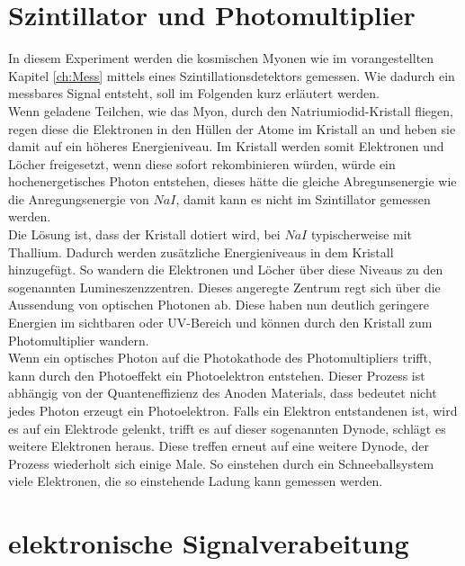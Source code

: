 \documentclass[12pt,a4paper,ngerman]{report}
\begin{document}
	\section{Szintillator und Photomultiplier}
	In diesem Experiment werden die kosmischen Myonen wie im vorangestellten Kapitel \ref{ch:Mess} mittels eines Szintillationsdetektors gemessen. Wie dadurch ein messbares Signal entsteht, soll im Folgenden kurz erläutert werden.\\
	Wenn geladene Teilchen, wie das Myon, durch den Natriumiodid-Kristall fliegen, regen diese die Elektronen in den Hüllen der Atome im Kristall an und heben sie damit auf ein höheres Energieniveau. Im Kristall werden somit Elektronen und Löcher freigesetzt, wenn diese sofort rekombinieren würden, würde ein hochenergetisches Photon entstehen, dieses hätte die gleiche Abregunsenergie wie die Anregungsenergie von $NaI$, damit kann es nicht im Szintillator gemessen werden.\\
	Die Lösung ist, dass der Kristall dotiert wird, bei $NaI$ typischerweise mit Thallium. Dadurch werden zusätzliche Energieniveaus in dem Kristall hinzugefügt. So wandern die Elektronen und Löcher über diese Niveaus zu den sogenannten Lumineszenzzentren. Dieses angeregte Zentrum regt sich über die Aussendung von optischen Photonen ab. Diese haben nun deutlich geringere Energien im sichtbaren oder UV-Bereich und können durch den Kristall zum Photomultiplier wandern.\\
	Wenn ein optisches Photon auf die Photokathode des Photomultipliers trifft, kann durch den Photoeffekt ein Photoelektron entstehen. Dieser Prozess ist abhängig von der Quanteneffizienz des Anoden Materials, dass bedeutet nicht jedes Photon erzeugt ein Photoelektron. Falls ein Elektron entstandenen ist, wird es auf ein Elektrode gelenkt, trifft es auf dieser sogenannten Dynode, schlägt es weitere Elektronen heraus. Diese treffen erneut auf eine weitere Dynode, der Prozess wiederholt sich einige Male. So einstehen durch ein Schneeballsystem viele Elektronen, die so einstehende Ladung kann gemessen werden.  
	
	 
	\section{elektronische Signalverabeitung}
\end{document}
